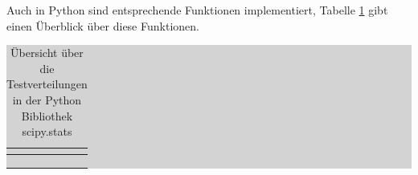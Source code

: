 \noindent Auch in Python sind entsprechende Funktionen implementiert, Tabelle \ref{tab:fourtwenty} gibt einen \"{U}berblick \"{u}ber diese Funktionen.

\begin{table}[H]
\caption{\"{U}bersicht \"{u}ber die Testverteilungen in der Python Bibliothek scipy.stats}
\setlength{\fboxsep}{0pt}%
\colorbox{lightgray}{%
%
\begin{tabular}{| c | c | c | c |}
\hline
\parbox[c][0.7in][c]{1.1in}{\smallskip\centering\textbf{\selectfont{Verteilung}}} & 
\parbox[c][0.7in][c]{1.7in}{\smallskip\centering\textbf{\selectfont{Dichtefunktion f(x)}}} &
\parbox[c][0.7in][c]{1.7in}{\smallskip\centering\textbf{\selectfont{Wahrscheinlichkeits-funktion F(x)}}} &
\parbox[c][0.7in][c]{1.7in}{\smallskip\centering\textbf{\selectfont{inverse Wahrscheinlichkeitsfunktion F-1(x)}}}\\ \hline

\parbox[c][0.3in][c]{1.1in}{\centering{}\selectfont{t-Verteilung}} &
\parbox[c][0.3in][c]{1.7in}{\centering{}\selectfont{t.pdf(x,$\nu$)}} &
\parbox[c][0.3in][c]{1.7in}{\centering{}\selectfont{t.cdf(x,$\nu$)}} &
\parbox[c][0.3in][c]{1.7in}{\centering{}\selectfont{t.ppf(P,$\nu$)}} \\ \hline

\parbox[c][0.5in][c]{1.1in}{\centering{}\selectfont{Chi-Quadrat-Verteilung}} &
\parbox[c][0.5in][c]{1.7in}{\centering{}\selectfont{chi2pdf(x,$\nu$)}} &
\parbox[c][0.5in][c]{1.7in}{\centering{}\selectfont{chi2cdf(x,$\nu$}} &
\parbox[c][0.5in][c]{1.7in}{\centering{}\selectfont{chi2inv(P,$\nu$}} \\ \hline

\parbox[c][0.3in][c]{1.1in}{\centering{}\selectfont{f-Verteilung}} &
\parbox[c][0.3in][c]{1.7in}{\centering{}\selectfont{fpdf(x,$\nu$ 1,$\nu$ 2)}} &
\parbox[c][0.3in][c]{1.7in}{\centering{}\selectfont{fcdf(x,$\nu$ 1,$\nu$ 2)}} &
\parbox[c][0.3in][c]{1.7in}{\centering{}\selectfont{finv(P,$\nu$ 1,$\nu$2)}} \\ \hline

\end{tabular}%
}\bigskip
\label{tab:fourtwenty}
\end{table}

\clearpage

